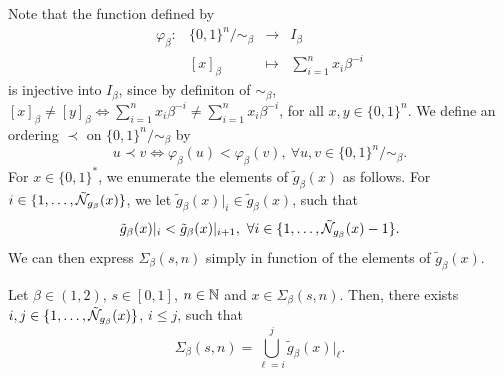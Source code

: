 Note that the function defined by
\begin{equation}
    \begin{array}{rccc}
        \varphi_\beta : & \{0,1\}^n / \sim_\beta & \to & I_\beta\\
        & [x]_\beta & \mapsto & \sum_{i=1}^n x_i \beta^{-i}
    \end{array}
\end{equation}
is injective into $I_\beta$, since by definiton of $\sim_\beta$, $[x]_\beta \neq [y]_\beta \iff \sum_{i=1}^n x_i \beta^{-i} \neq \sum_{i=1}^n x_i \beta^{-i}$, for all $x,y \in \{0,1\}^n$. We define an ordering $\prec$ on $\{0,1\}^n / \sim_\beta$ by 
\begin{equation}
    u \prec v \iff \varphi_\beta(u) < \varphi_\beta(v), \ \forall u,v \in \{0,1\}^n / \sim_\beta.
\end{equation}
For $x \in \{0,1\}^\ast$, we enumerate the elements of $\tilde g_\beta(x)$ as follows. For $i \in \{1,\ldots, \tilde {\mathcal{N}}_{g_\beta}(x)\}$, we let $\tilde g_\beta(x)|_i \in \tilde g_\beta(x)$, such that
\begin{equation}
    \tilde g_\beta(x)|_i < \tilde g_\beta(x)|_{i+1}, \ \forall i \in \{1,\ldots, \tilde {\mathcal{N}}_{g_\beta}(x) - 1\}.
\end{equation}
We can then express $\Sigma_\beta(s,n)$ simply in function of the elements of $\tilde g_\beta(x)$. 
\begin{lemma}\label{lem:the set of beta expansion is expressed as a union of consecutive equivalence classes}
    Let $\beta \in (1,2)$, $s \in [0,1]$, $n \in \mathbb{N}$ and $x \in \Sigma_\beta(s,n)$. Then, there exists $i,j \in \{1, \ldots, \tilde {\mathcal{N}}_{g_\beta}(x)\}$, $i \leq j$, such that 
    \begin{equation}
        \Sigma_\beta(s,n) = \bigcup_{\ell=i}^j\tilde g_\beta(x)|_\ell.
    \end{equation}
\end{lemma}
